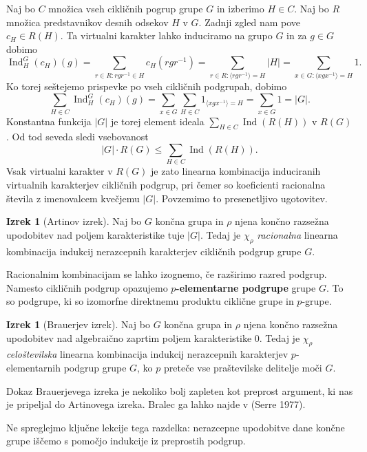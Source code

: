 \documentclass[11pt]{book}
\DeclareMathOperator\Ind{Ind}
\def\definicija{\color{rdeca}\bf}
\def\literatura{\color{modra}}
\theoremstyle{definition}
\theoremstyle{zgled}
\theoremstyle{zgledbrezstevilke}
\theoremstyle{odprtproblem}
\theoremstyle{domacanaloga}
\theoremstyle{izrek}
\newtheorem{izrek}[theorem]{Izrek}
\begin{document}
Naj bo $C$ množica vseh cikličnih pogrup grupe $G$ in izberimo $H \in C$. Naj bo $R$ množica predstavnikov desnih odsekov $H$ v $G$. Zadnji zgled nam pove $c_H \in R(H)$. Ta virtualni karakter lahko induciramo na grupo $G$ in za $g \in G$ dobimo
\[
    {\textstyle \Ind^G_H(c_H)(g)} = \sum_{r \in R \colon r g r^{-1} \in H} c_H(r g r^{-1}) =
    \sum_{r \in R \colon \langle r g r^{-1} \rangle = H} |H| =
    \sum_{x \in G \colon  \langle x g x^{-1} \rangle = H} 1.
\]
Ko torej seštejemo prispevke po vseh cikličnih podgrupah, dobimo
\[
  \sum_{H \in C} {\textstyle \Ind^G_H(c_H)(g)} = \sum_{x \in G} \sum_{H \in C} 1_{\langle x g x^{-1} \rangle = H} = \sum_{x \in G} 1 = |G|.  
\]
Konstantna funkcija $|G|$ je torej element ideala $\sum_{H \in C} \Ind(R(H))$ v $R(G)$. Od tod seveda sledi vsebovanost 
\[
    |G| \cdot R(G) \leq \sum_{H \in C} \Ind(R(H)).
\]
Vsak virtualni karakter v $R(G)$ je zato linearna kombinacija induciranih virtualnih karakterjev cikličnih podgrup, pri čemer so koeficienti racionalna števila z imenovalcem kvečjemu $|G|$. Povzemimo to presenetljivo ugotovitev.

\begin{izrek}[Artinov izrek]
Naj bo $G$ končna grupa in $\rho$ njena končno razsežna upodobitev nad poljem karakteristike tuje $|G|$. Tedaj je $\chi_{\rho}$ \emph{racionalna} linearna kombinacija indukcij nerazcepnih karakterjev cikličnih podgrup grupe $G$.
\end{izrek}

Racionalnim kombinacijam se lahko izognemo, če razširimo razred podgrup. Namesto cikličnih podgrup opazujemo {\definicija $p$-elementarne podgrupe} grupe $G$. To so podgrupe, ki so izomorfne direktnemu produktu ciklične grupe in $p$-grupe.

\begin{izrek}[Brauerjev izrek]
Naj bo $G$ končna grupa in $\rho$ njena končno razsežna upodobitev nad algebraično zaprtim poljem karakteristike $0$. Tedaj je $\chi_{\rho}$ \emph{celoštevilska} linearna kombinacija indukcij nerazcepnih karakterjev $p$-elementarnih podgrup grupe $G$, ko $p$ preteče vse praštevilske delitelje moči $G$.
\end{izrek}

Dokaz Brauerjevega izreka je nekoliko bolj zapleten kot preprost argument, ki nas je pripeljal do Artinovega izreka. Bralec ga lahko najde v {\literatura (Serre 1977)}. 

Ne spreglejmo ključne lekcije tega razdelka: nerazcepne upodobitve dane končne grupe iščemo s pomočjo indukcije iz preprostih podgrup.
\end{document}
